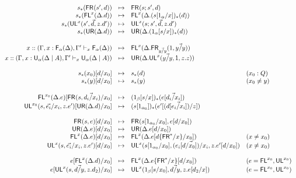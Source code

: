 \begin{figure}
\[
\begin{array}{rcll}
s_*(\mathsf{FR}_{}(s',d)) & \mapsto & \mathsf{FR}_{}(s;s',d)\\
s_*(\mathsf{FL}^{x}(\Delta.d)) & \mapsto & \mathsf{FL}^{x}(\Delta.(s[1_\alpha/x])_*(d))\\
s_*(\mathsf{UL}^{x}_{}(s',\vec{d},z.d')) & \mapsto & {\mathsf{UL}^{x}_{}(s;s',\vec{d},z.d')}\\
s_*(\mathsf{UR}(\Delta.d)) & \mapsto & \mathsf{UR}(\Delta.(1_\alpha[s/x])_*(d)) \\
\\
x :: (\Gamma,x:\mathsf{F}_{\alpha}(\Delta),\Gamma' \vdash_{x} \mathsf{F}_{\alpha}(\Delta)) & \mapsto & \mathsf{FL}^{x}(\Delta.\mathsf{FR}_{\vec{y/y}}(1,\vec{y/y}))\\
x :: (\Gamma,x:\mathsf{U}_{\alpha}(\Delta \mid A),\Gamma' \vdash_{x} \mathsf{U}_{\alpha}(\Delta \mid A)) & \mapsto & \mathsf{UR}(\Delta.\mathsf{UL}^{x}_{}(\vec{y/y},1,z.z)) \\
\\
s_*(x_0)[d/x_0] & \mapsto & s_*(d) & (x_0 : Q)\\
s_*(y)[d/x_0] & \mapsto & s_*(y) & (x_0 \neq y)\\
\\
\mathsf{FL}^{x_0}(\Delta.e)[\mathsf{FR}_{}(s,\vec{d_i/x_i})/x_0] & \mapsto & (1_\beta[s/x])_*(e[\vec{d_i/x_i}]) \\
\mathsf{UL}^{x_0}_{}(s,\vec{e_i}/x_i,z.e')[\mathsf{UR}(\Delta.d)/x_0] & \mapsto & (s[1_{\alpha_0}])_*(e'[(d[{\vec{e_i/x_i}}])/z]) &  \\
\\
\mathsf{FR}_{}(s,e)[d/x_0] & \mapsto & {\mathsf{FR}_{}(s[1_{\alpha_0}/x_0],e[d/x_0])}\\
\mathsf{UR}(\Delta.e)[d/x_0] & \mapsto & \mathsf{UR}(\Delta.e[d/x_0])\\
\mathsf{FL}^{x}(\Delta.e)[d/x_0] & \mapsto & \mathsf{FL}^{x}(\Delta.e[d\{\mathsf{FR}^*/x\}/x_0]) & (x \neq x_0) \\
\mathsf{UL}^{x}_{}(s,\vec{e_i}/x_i,z.e')[d/x_0] & \mapsto & {\mathsf{UL}^{x}_{}(s[1_{\alpha_0}/x_0],\vec{(e_i[d/x_0])/x_i},z.e'[d/x_0])} & (x \neq x_0)\\
\\
e[\mathsf{FL}^{x}(\Delta.d)/x_0] & \mapsto & \mathsf{FL}^{x}(\Delta.e\{\mathsf{FR}^*/x\}[d/x_0]) & (e = \mathsf{FL}^{x_0},\mathsf{UL}^{x_0})\\
e[\mathsf{UL}^{x}_{}(s,\vec{d/y},z.d_2)/x_0] & \mapsto & \mathsf{UL}^{x}_{}(1_\beta[s/x_0],\vec{d/y},z.e[d_2/x]) & (e = \mathsf{FL}^{x_0},\mathsf{UL}^{x_0}) \\

\end{array}\]
\end{figure}

